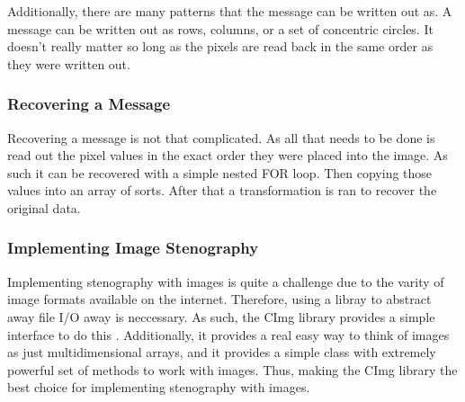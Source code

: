 \documentclass[12pt]{article}
\begin{document}
      Additionally, there are many patterns that the message can be
      written out as. A message can be written out as rows, columns,
      or a set of concentric circles. It doesn't really matter so long
      as the pixels are read back in the same order as they were
      written out.
          
    \subsubsection{Recovering a Message}    
      Recovering a message is not that complicated. As all that needs
      to be done is read out the pixel values in the exact order they
      were placed into the image. As such it can be recovered with a
      simple nested FOR loop. Then copying those values into an array
      of sorts. After that a transformation is ran to recover the
      original data.

    \subsubsection{Implementing Image Stenography}
      Implementing stenography with images is quite a challenge due to
      the varity of image formats available on the internet. Therefore,
      using a libray to abstract away file I/O away is neccessary.  As
      such, the CImg library provides a simple interface to do this
      \cite{cimg}. Additionally, it provides a real easy way to think of
      images as just multidimensional arrays, and it provides a simple
      class with extremely powerful set of methods to work with images.
      Thus, making the CImg library the best choice for implementing 
      stenography with images.

      


\end{document}
